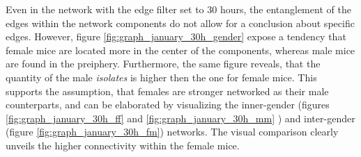 Even in the network with the edge filter set to 30 hours, the entanglement of the edges within the network components do not allow for a conclusion about specific edges. However, figure \ref{fig:graph_january_30h_gender} expose a tendency that female mice are located more in the center of the components, whereas male mice are found in the preiphery. Furthermore, the same figure reveals, that the quantity of the male \textit{isolates} is higher then the one for female mice. This supports the assumption, that females are stronger networked as their male counterparts, and can be elaborated by visualizing the inner-gender (figures \ref{fig:graph_january_30h_ff} and \ref{fig:graph_january_30h_mm} ) and inter-gender (figure \ref{fig:graph_january_30h_fm}) networks. The visual comparison clearly unveils the higher connectivity within the female mice.

